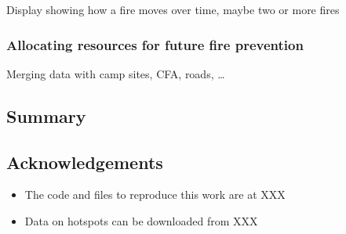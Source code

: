 Display showing how a fire moves over time, maybe two or more fires

\hypertarget{allocating-resources-for-future-fire-prevention}{%
\subsubsection{Allocating resources for future fire
prevention}\label{allocating-resources-for-future-fire-prevention}}

Merging data with camp sites, CFA, roads, \ldots{}

\hypertarget{summary}{%
\subsection{Summary}\label{summary}}

\hypertarget{acknowledgements}{%
\subsection{Acknowledgements}\label{acknowledgements}}

\begin{itemize}
\tightlist
\item
  The code and files to reproduce this work are at XXX
\item
  Data on hotspots can be downloaded from XXX
\end{itemize}




\address{%
Weihao Li\\
Monash University\\%
line 1\\ line 2\\
%
%
%
\\\href{mailto:wlii0039@student.monash.edu}{\nolinkurl{wlii0039@student.monash.edu}}
}

\address{%
Emily Dodwell\\
AT\&T\\%
line 1\\ line 2\\
%
%
%
\\\href{mailto:emdodwell@gmail.com}{\nolinkurl{emdodwell@gmail.com}}
}

\address{%
Dianne Cook\\
Monash University\\%
line 1\\ line 2\\
%
%
%
\\\href{mailto:dicook@monash.edu}{\nolinkurl{dicook@monash.edu}}
}

